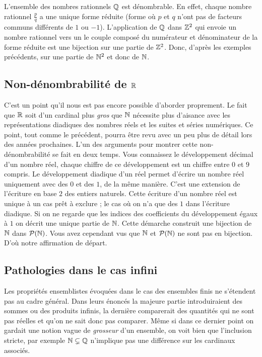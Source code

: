 \documentclass[12pt, a4paper]{article}
\begin{document}
\begin{exmp}
  L'ensemble des nombres rationnels $\mathbb{Q}$ est dénombrable. En effet,
  chaque nombre rationnel $\frac{p}{q}$ a une unique forme réduite
  (forme où $p$ et $q$ n'ont pas de facteurs communs différents de $1$
  ou $-1$). L'application de $\mathbb{Q}$ dans $\mathbb{Z}^2$ qui envoie un nombre
  rationnel vers un le couple composé du numérateur et dénominateur de
  la forme réduite est une bijection sur une partie de $\mathbb{Z}^2$. Donc,
  d'après les exemples précédents, sur une partie de $\mathbb{N}^2$ et donc de
  $\mathbb{N}$.
\end{exmp}

\subsection{Non-dénombrabilité de $\mathbb{R}$}

C'est un point qu'il nous est pas encore possible d'aborder
proprement. Le fait que $\mathbb{R}$ soit d'un cardinal plus \emph{gros} que
$\mathbb{N}$ nécessite plus d'aisance avec les représentations diadiques des
nombres réels et les suites et séries numériques. Ce point, tout comme
le précédent, pourra être revu avec un peu plus de détail lors des
années prochaines. L'un des arguments pour montrer cette
non-dénombrabilité se fait en deux temps. Vous connaissez le
développement décimal d'un nombre réel, chaque chiffre de ce
développement est un chiffre entre $0$ et $9$ compris. Le
développement diadique d'un réel permet d'écrire un nombre réel
uniquement avec des $0$ et des $1$, de la même manière. C'est une
extension de l'écriture en base $2$ des entiers naturels. Cette
écriture d'un nombre réel est unique à un cas prêt à exclure ; le cas
où on n'a que des $1$ dans l'écriture diadique. Si on ne regarde que
les indices des coefficients du développement égaux à $1$ on décrit une
unique partie de $\mathbb{N}$. Cette démarche construit une bijection de $\mathbb{N}$
dans $\mathcal{P}(\mathbb{N})$. Vous avez cependant vus que $\mathbb{N}$ et $\mathcal{P}(\mathbb{N})$ ne
sont pas en bijection. D'où notre affirmation de départ.


\subsection{Pathologies dans le cas infini}

Les propriétés ensemblistes évoquées dans le cas des ensembles finis
ne s'étendent pas au cadre général. Dans leurs énoncés la majeure
partie introduiraient des sommes ou des produits infinis, la dernière
comparerait des quantités qui ne sont pas réelles et qu'on ne sait
donc pas comparer. Même si dans ce dernier point on gardait une notion
vague de \emph{grosseur} d'un ensemble, on voit bien que l'inclusion
stricte, par exemple $\mathbb{N} \subsetneq \mathbb{Q}$ n'implique pas une différence
sur les cardinaux associés.
\end{document}
